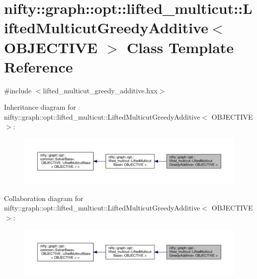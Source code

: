 \hypertarget{classnifty_1_1graph_1_1opt_1_1lifted__multicut_1_1LiftedMulticutGreedyAdditive}{}\section{nifty\+:\+:graph\+:\+:opt\+:\+:lifted\+\_\+multicut\+:\+:Lifted\+Multicut\+Greedy\+Additive$<$ O\+B\+J\+E\+C\+T\+I\+VE $>$ Class Template Reference}
\label{classnifty_1_1graph_1_1opt_1_1lifted__multicut_1_1LiftedMulticutGreedyAdditive}


{\ttfamily \#include $<$lifted\+\_\+multicut\+\_\+greedy\+\_\+additive.\+hxx$>$}



Inheritance diagram for nifty\+:\+:graph\+:\+:opt\+:\+:lifted\+\_\+multicut\+:\+:Lifted\+Multicut\+Greedy\+Additive$<$ O\+B\+J\+E\+C\+T\+I\+VE $>$\+:
\nopagebreak
\begin{figure}[H]
\begin{center}
\leavevmode
\includegraphics[width=350pt]{classnifty_1_1graph_1_1opt_1_1lifted__multicut_1_1LiftedMulticutGreedyAdditive__inherit__graph}
\end{center}
\end{figure}


Collaboration diagram for nifty\+:\+:graph\+:\+:opt\+:\+:lifted\+\_\+multicut\+:\+:Lifted\+Multicut\+Greedy\+Additive$<$ O\+B\+J\+E\+C\+T\+I\+VE $>$\+:
\nopagebreak
\begin{figure}[H]
\begin{center}
\leavevmode
\includegraphics[width=350pt]{classnifty_1_1graph_1_1opt_1_1lifted__multicut_1_1LiftedMulticutGreedyAdditive__coll__graph}
\end{center}
\end{figure}
